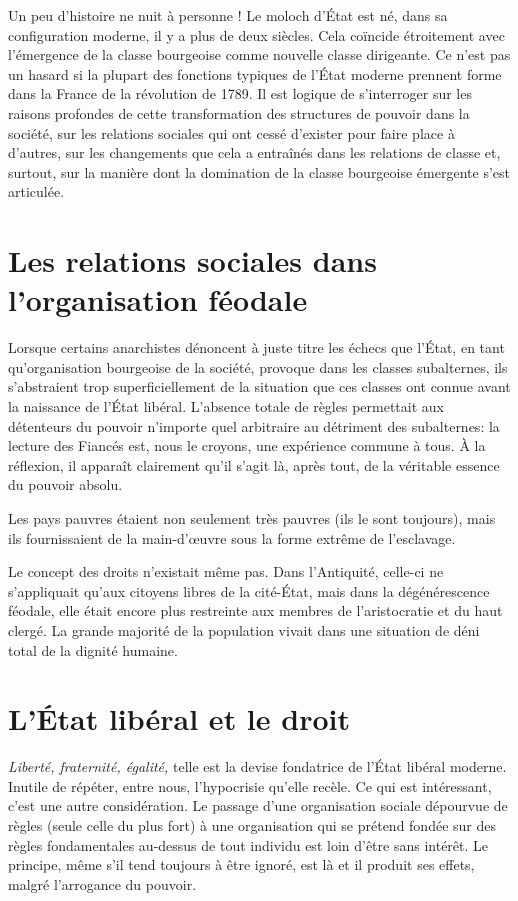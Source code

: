 Un peu d'histoire ne nuit à personne ! Le moloch d'État est né, dans sa configuration moderne, il y a plus de deux siècles. Cela coïncide étroitement avec l'émergence de la classe bourgeoise comme nouvelle classe dirigeante. Ce n'est pas un hasard si la plupart des fonctions typiques de l'État moderne prennent forme dans la France de la révolution de 1789. Il est logique de s'interroger sur les raisons profondes de cette transformation des structures de pouvoir dans la société, sur les relations sociales qui ont cessé d'exister pour faire place à d'autres, sur les changements que cela a entraînés dans les relations de classe et, surtout, sur la manière dont la domination de la classe bourgeoise émergente s'est articulée.

\section{Les relations sociales dans l'organisation féodale}

Lorsque certains anarchistes dénoncent à juste titre les échecs que l'État, en tant qu'organisation bourgeoise de la société, provoque dans les classes subalternes, ils s'abstraient trop superficiellement de la situation que ces classes ont connue avant la naissance de l'État libéral. L'absence totale de règles permettait aux détenteurs du pouvoir n'importe quel arbitraire au détriment des subalternes: la lecture des Fiancés est, nous le croyons, une expérience commune à tous. À la réflexion, il apparaît clairement qu'il s'agit là, après tout, de la véritable essence du pouvoir absolu.

Les pays pauvres étaient non seulement très pauvres (ils le sont toujours), mais ils fournissaient de la main-d'œuvre sous la forme extrême de l'esclavage.

Le concept des droits n'existait même pas. Dans l'Antiquité, celle-ci ne s'appliquait qu'aux citoyens libres de la cité-État, mais dans la dégénérescence féodale, elle était encore plus restreinte aux membres de l'aristocratie et du haut clergé. La grande majorité de la population vivait dans une situation de déni total de la dignité humaine.

\section{L'État libéral et le droit}

\emph{Liberté, fraternité, égalité,} telle est la devise fondatrice de l'État libéral moderne. Inutile de répéter, entre nous, l'hypocrisie qu'elle recèle. Ce qui est intéressant, c'est une autre considération. Le passage d'une organisation sociale dépourvue de règles (seule celle du plus fort) à une organisation qui se prétend fondée sur des règles fondamentales au-dessus de tout individu est loin d'être sans intérêt. Le principe, même s'il tend toujours à être ignoré, est là et il produit ses effets, malgré l'arrogance du pouvoir.

